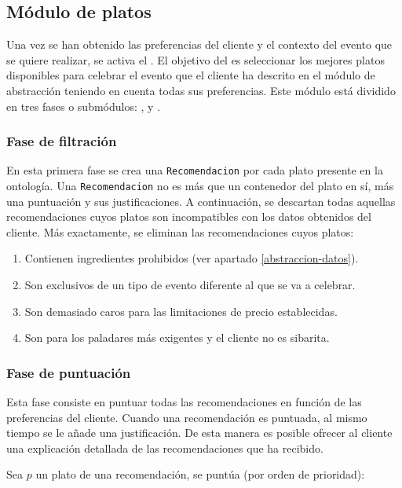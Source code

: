 % 

\subsection{Módulo de platos}
Una vez se han obtenido las preferencias del cliente y el contexto del evento que se quiere realizar, se activa el
.
El objetivo del  es seleccionar los mejores platos disponibles para celebrar el evento que el cliente ha 
descrito en el módulo de abstracción teniendo en cuenta todas sus preferencias. Este módulo está dividido en tres fases o submódulos: 
,  y .

\subsubsection{Fase de filtración}
En esta primera fase se crea una \texttt{Recomendacion} por cada plato presente en la ontología. Una \texttt{Recomendacion} no es más
que un contenedor del plato en sí, más una puntuación y sus justificaciones.
A continuación, se descartan todas aquellas recomendaciones cuyos platos son incompatibles con los datos obtenidos del cliente. Más
exactamente, se eliminan las recomendaciones cuyos platos:

\begin{enumerate}
\item Contienen ingredientes prohibidos (ver apartado \ref{abstraccion-datos}).
\item Son exclusivos de un tipo de evento diferente al que se va a celebrar.
\item Son demasiado caros para las limitaciones de precio establecidas.
\item Son para los paladares más exigentes y el cliente no es sibarita.
\end{enumerate}

\subsubsection{Fase de puntuación}
Esta fase consiste en puntuar todas las recomendaciones en función de las preferencias del cliente. Cuando una recomendación
es puntuada, al mismo tiempo se le añade una justificación. De esta manera es posible ofrecer al cliente una explicación detallada
de las recomendaciones que ha recibido.

Sea $p$ un plato de una recomendación, se puntúa (por orden de prioridad):

